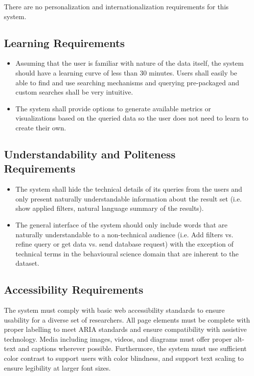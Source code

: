 \documentclass[12pt]{article}
\begin{document}
\par{There are no personalization and internationalization requirements for this system.}



\subsection{Learning Requirements}

\begin{itemize}
    \item Assuming that the user is familiar with nature of the data itself, the system should
    have a learning curve of less than 30 minutes. Users shall easily be able to find and use searching
    mechanisms and querying pre-packaged and custom searches shall be very intuitive.
    \item The system shall provide options to generate available metrics or visualizations based on the queried
    data so the user does not need to learn to create their own.
\end{itemize}

\subsection{Understandability and Politeness Requirements}

\begin{itemize}
    \item The system shall hide the technical details of its queries from the users and only present naturally understandable information
    about the result set (i.e. show applied filters, natural language summary of the results).
    \item The general interface of the system should only include words that are naturally understandable to a non-technical audience (i.e. Add filters vs.
    refine query or get data vs. send database request) with the exception of technical terms in the behavioural science domain
    that are inherent to the dataset.
\end{itemize}

\subsection{Accessibility Requirements}

\par{
   The system must comply with basic web accessibility standards to ensure usability for a diverse set of researchers. All page elements must be complete with proper labelling to meet ARIA standards and ensure compatibility with assistive technology. Media including images, videos, and diagrams must offer proper alt-text and captions wherever possible. Furthermore, the system must use sufficient color contrast to support users with color blindness, and support text scaling to ensure legibility at larger font sizes.   
}
\end{document}
